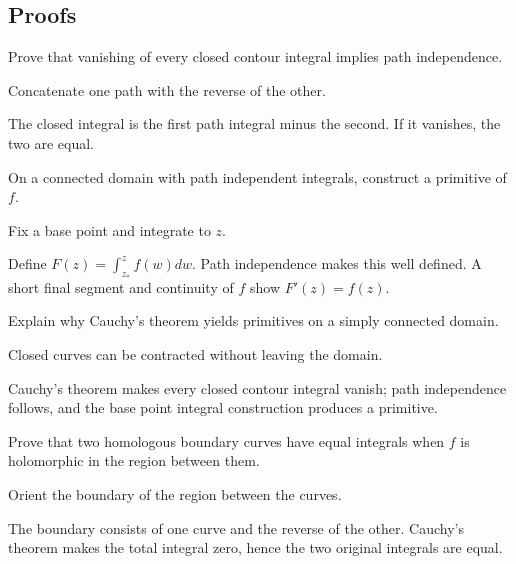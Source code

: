 \subsection*{Proofs}

\begin{exercise}\label{exr:iv05-expand-06}
Prove that vanishing of every closed contour integral implies path independence.
\end{exercise}
\begin{hint}
Concatenate one path with the reverse of the other.
\end{hint}
\begin{solution}
The closed integral is the first path integral minus the second. If it vanishes, the two are equal.
\end{solution}

\begin{exercise}\label{exr:iv05-expand-07}
On a connected domain with path independent integrals, construct a primitive of \(f\).
\end{exercise}
\begin{hint}
Fix a base point and integrate to \(z\).
\end{hint}
\begin{solution}
Define \(F(z)=\int_{z_*}^{z}f(w)dw\). Path independence makes this well defined. A short final segment and continuity of \(f\) show \(F'(z)=f(z)\).
\end{solution}

\begin{exercise}\label{exr:iv05-expand-08}
Explain why Cauchy's theorem yields primitives on a simply connected domain.
\end{exercise}
\begin{hint}
Closed curves can be contracted without leaving the domain.
\end{hint}
\begin{solution}
Cauchy's theorem makes every closed contour integral vanish; path independence follows, and the base point integral construction produces a primitive.
\end{solution}

\begin{exercise}\label{exr:iv05-expand-09}
Prove that two homologous boundary curves have equal integrals when \(f\) is holomorphic in the region between them.
\end{exercise}
\begin{hint}
Orient the boundary of the region between the curves.
\end{hint}
\begin{solution}
The boundary consists of one curve and the reverse of the other. Cauchy's theorem makes the total integral zero, hence the two original integrals are equal.
\end{solution}

